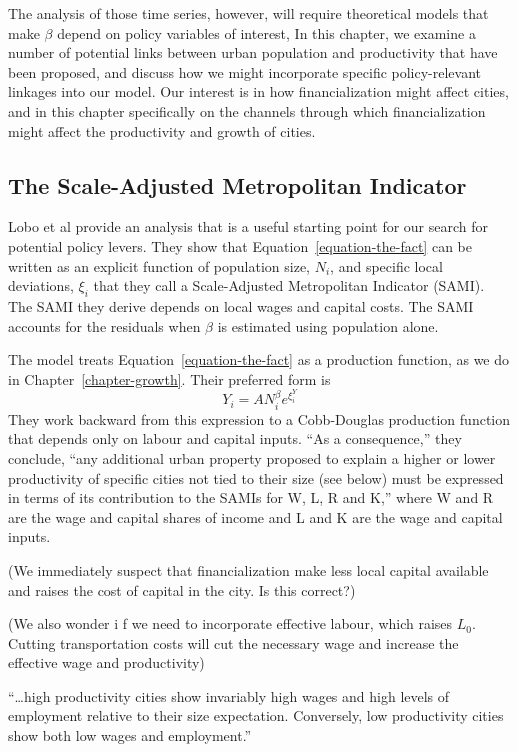 The analysis of those time series, however, will require theoretical models that make $\beta$ depend on policy variables of interest,  In this chapter, we examine a number of potential  links between urban population and productivity that have been proposed, and discuss how we  might incorporate specific policy-relevant linkages into our model.  Our interest is in how financialization might affect cities, and in this chapter specifically on the channels through which financialization might affect the productivity and growth of cities.


\subsection{The Scale-Adjusted Metropolitan Indicator}
 Lobo et al \cite{loboUrbanScalingProduction2013} provide an  analysis that is a useful starting point for our  search for potential policy levers. They show that Equation~\ref{equation-the-fact} can be written as an explicit function of population size, $N_i$, and specific local deviations, $\xi_i$ that they  call a Scale-Adjusted Metropolitan Indicator (SAMI). The SAMI they derive depends on local wages and capital costs. The  SAMI accounts for the residuals when $\beta$ is estimated using population alone. 
 
 The model treats Equation~\ref{equation-the-fact} as a production function, as we do in Chapter~\ref{chapter-growth}.  Their preferred form is
 \[Y_i =A N^\beta_ i e^{\xi_i^Y} \]
 They work backward from this expression to a Cobb-Douglas production function that depends only on labour and capital inputs. ``As a consequence,'' they conclude, ``any additional urban property proposed to explain a higher or lower productivity of specific cities not tied to their size (see below) must be expressed in terms of its contribution to the SAMIs for W, L, R and K,''   where W and R are the wage and capital shares of income and  L and K are the wage and capital inputs.

(We immediately suspect that financialization make less local capital available and raises the cost of capital in the city.  Is this correct?)

 
 

(We also wonder i f we need to incorporate effective labour, which raises $L_0$. Cutting transportation costs will cut the necessary wage and increase the effective wage and productivity)

``\dots high productivity cities show invariably high wages and high levels of employment relative to their size expectation. Conversely, low productivity cities show both low wages and employment.''

